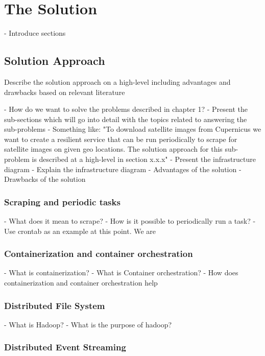\chapter{The Solution}

- Introduce sections

\section{Solution Approach}
Describe the solution approach on a high-level including advantages and drawbacks based on relevant literature 

- How do we want to solve the problems described in chapter 1?
    - Present the sub-sections which will go into detail with the topics related to answering the sub-problems
    - Something like: "To download satellite images from Cupernicus we want to create a resilient service that can be run periodically to scrape for satellite images on given geo locations. The solution approach for this sub-problem is described at a high-level in section x.x.x"
- Present the infrastructure diagram
- Explain the infrastructure diagram
- Advantages of the solution
- Drawbacks of the solution

\subsection{Scraping and periodic tasks}

- What does it mean to scrape?
- How is it possible to periodically run a task?
    - Use crontab as an example at this point. We are

\subsection{Containerization and container orchestration}

- What is containerization?
- What is Container orchestration?
- How does containerization and container orchestration help

\subsection{Distributed File System}

- What is Hadoop?
- What is the purpose of hadoop?

\subsection{Distributed Event Streaming}

